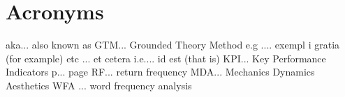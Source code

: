 \chapter{Acronyms}\label{chapter:acronyms}


aka...
also known as
GTM...
Grounded Theory Method
e.g
....
exempl
i gratia (for example)
etc
...
et cetera
i.e....
id est (that is)
KPI...
Key Performance Indicators
p...
page
RF...
return frequency
MDA...
Mechanics Dynamics Aesthetics
WFA
...
word frequency analysis
